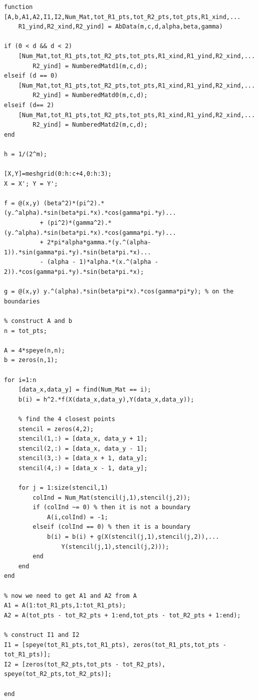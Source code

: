 \documentclass[12pt]{article}
\begin{document}
\lstset{language=matlab,frame=single}
\begin{lstlisting}[caption=Construct Matrix $A$ and Vector $b$]
function [A,b,A1,A2,I1,I2,Num_Mat,tot_R1_pts,tot_R2_pts,tot_pts,R1_xind,...
    R1_yind,R2_xind,R2_yind] = AbData(m,c,d,alpha,beta,gamma)

if (0 < d && d < 2)
    [Num_Mat,tot_R1_pts,tot_R2_pts,tot_pts,R1_xind,R1_yind,R2_xind,...
        R2_yind] = NumberedMatd1(m,c,d);
elseif (d == 0)
    [Num_Mat,tot_R1_pts,tot_R2_pts,tot_pts,R1_xind,R1_yind,R2_xind,...
        R2_yind] = NumberedMatd0(m,c,d);
elseif (d== 2)
    [Num_Mat,tot_R1_pts,tot_R2_pts,tot_pts,R1_xind,R1_yind,R2_xind,...
        R2_yind] = NumberedMatd2(m,c,d);
end

h = 1/(2^m);

[X,Y]=meshgrid(0:h:c+4,0:h:3);
X = X'; Y = Y';

f = @(x,y) (beta^2)*(pi^2).*(y.^alpha).*sin(beta*pi.*x).*cos(gamma*pi.*y)...
          + (pi^2)*(gamma^2).*(y.^alpha).*sin(beta*pi.*x).*cos(gamma*pi.*y)...
          + 2*pi*alpha*gamma.*(y.^(alpha-1)).*sin(gamma*pi.*y).*sin(beta*pi.*x)...
          - (alpha - 1)*alpha.*(x.^(alpha - 2)).*cos(gamma*pi.*y).*sin(beta*pi.*x);

g = @(x,y) y.^(alpha).*sin(beta*pi*x).*cos(gamma*pi*y); % on the boundaries

% construct A and b
n = tot_pts;

A = 4*speye(n,n);
b = zeros(n,1);

for i=1:n
    [data_x,data_y] = find(Num_Mat == i);
    b(i) = h^2.*f(X(data_x,data_y),Y(data_x,data_y));
    
    % find the 4 closest points
    stencil = zeros(4,2);
    stencil(1,:) = [data_x, data_y + 1];
    stencil(2,:) = [data_x, data_y - 1];
    stencil(3,:) = [data_x + 1, data_y];
    stencil(4,:) = [data_x - 1, data_y];
    
    for j = 1:size(stencil,1)
        colInd = Num_Mat(stencil(j,1),stencil(j,2));
        if (colInd ~= 0) % then it is not a boundary
            A(i,colInd) = -1;
        elseif (colInd == 0) % then it is a boundary
            b(i) = b(i) + g(X(stencil(j,1),stencil(j,2)),...
                Y(stencil(j,1),stencil(j,2))); 
        end
    end
end

% now we need to get A1 and A2 from A
A1 = A(1:tot_R1_pts,1:tot_R1_pts);
A2 = A(tot_pts - tot_R2_pts + 1:end,tot_pts - tot_R2_pts + 1:end);

% construct I1 and I2
I1 = [speye(tot_R1_pts,tot_R1_pts), zeros(tot_R1_pts,tot_pts - tot_R1_pts)];
I2 = [zeros(tot_R2_pts,tot_pts - tot_R2_pts), speye(tot_R2_pts,tot_R2_pts)];

end
\end{lstlisting}
\end{document}
